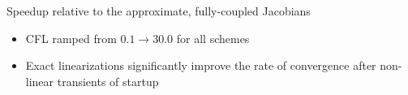 \documentclass{beamer}
\begin{document}
\begin{frame}
\begin{itemize}
\begin{columns}
\begin{column}{0.6\textwidth}
\begin{table}
            \caption{Speedup relative to the approximate, fully-coupled Jacobians}
            \label{tab:1st-order}
          \end{table}
          \vspace{-0.5cm}
          \begin{itemize}
            \item CFL ramped from $0.1 \rightarrow 30.0$ for all schemes
            \item Exact linearizations significantly improve the rate of
              convergence after non-linear transients of startup
          \end{itemize}
        \end{column}
      \end{columns}
  \end{itemize}
\end{frame}
\end{document}
